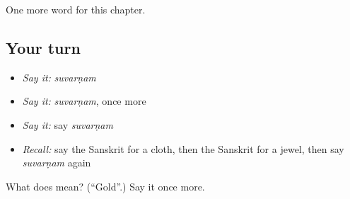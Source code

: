 \begin{grammarlens}[title={What you've built}]
One more word for this chapter.
\end{grammarlens}

\subsection*{Your turn}
\begin{itemize}
\raggedright
  \item \emph{Say it:} \emph{suvarṇam}
  \item \emph{Say it:} \emph{suvarṇam}, once more
  \item \emph{Say it:} say \emph{suvarṇam}
  \item \emph{Recall:} say the Sanskrit for a cloth, then the Sanskrit for a jewel, then say \emph{suvarṇam} again
\end{itemize}

\begin{tcolorbox}[breakable,colback=teal!4,colframe=teal!35!black,title={Before you move on}]
What does  mean? (\textquotedblleft{}Gold\textquotedblright{}.) Say it once more.
\end{tcolorbox}
